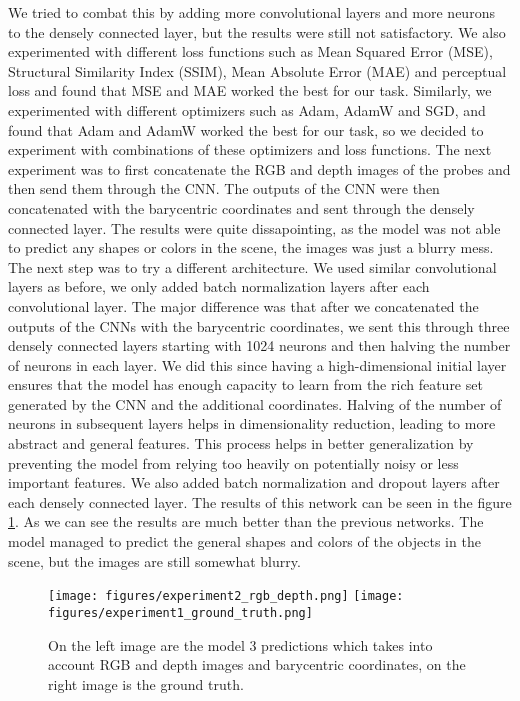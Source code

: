 We tried to combat this by adding more convolutional layers and more neurons to the densely connected layer, but the results were still not satisfactory.
We also experimented with different loss functions such as Mean Squared Error (MSE), Structural Similarity Index (SSIM), Mean Absolute Error (MAE) and perceptual loss and found that MSE and MAE worked the best for our task.
Similarly, we experimented with different optimizers such as Adam, AdamW and SGD, and found that Adam and AdamW worked the best for our task, so we decided to experiment with combinations of these optimizers and loss functions.
The next experiment was to first concatenate the RGB and depth images of the probes and then send them through the CNN. The outputs of the CNN were then concatenated with the barycentric coordinates and sent through the densely connected layer.
The results were quite dissapointing, as the model was not able to predict any shapes or colors in the scene, the images was just a blurry mess.
The next step was to try a different architecture. We used similar convolutional layers as before, we only added batch normalization layers after each convolutional layer.
The major difference was that after we concatenated the outputs of the CNNs with the barycentric coordinates, we sent this through three densely connected layers starting with 1024 neurons and then halving the number of neurons in each layer.
We did this since having a high-dimensional initial layer ensures that the model has enough capacity to learn from the rich feature set generated by the CNN and the additional coordinates.
Halving of the number of neurons in subsequent layers helps in dimensionality reduction, leading to more abstract and general features. This process helps in better generalization by preventing the model from relying too heavily on potentially noisy or less important features.
We also added batch normalization and dropout layers after each densely connected layer. The results of this network can be seen in the figure \ref{fig:neural_network_3}.
As we can see the results are much better than the previous networks. The model managed to predict the general shapes and colors of the objects in the scene, but the images are still somewhat blurry.
\begin{figure}[htb]
    \centering
    \texttt{[image: figures/experiment2\_rgb\_depth.png]}
    \texttt{[image: figures/experiment1\_ground\_truth.png]}

    \caption{On the left image are the model 3 predictions which takes into account RGB and depth images and barycentric coordinates, on the right image is the ground truth.}
    \label{fig:neural_network_3}
\end{figure}

